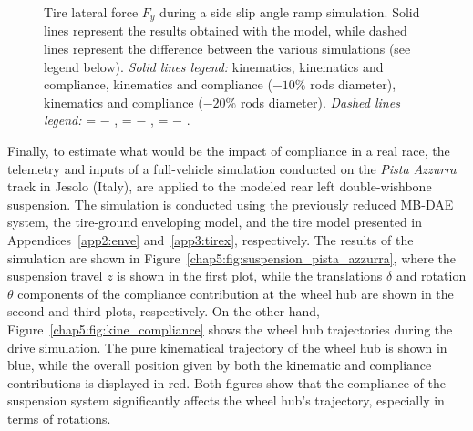 \begin{figure}[!htp]
  \centering
  \small{}
  \caption{Tire lateral force $F_y$ during a side slip angle ramp simulation. Solid lines represent the results obtained with the \Simulink{} model, while dashed lines represent the difference between the various simulations (see legend below). \emph{Solid lines legend:}
  {\color{mycolor1}\raisebox{-.15pt}{$\blacksquare$}} kinematics, {\color{mycolor2}\raisebox{-.15pt}{$\blacksquare$}} kinematics and compliance, {\color{mycolor3}\raisebox{-.15pt}{$\blacksquare$}} kinematics and compliance ($-10\%$ rods diameter), {\color{mycolor5}\raisebox{-.15pt}{$\blacksquare$}} kinematics and compliance ($-20\%$ rods diameter).   \emph{Dashed lines legend:} {\color{mycolor1}\raisebox{-.15pt}{\scalebox{0.5}[1.0]{$\blacksquare$}}}{\color{mycolor2}\raisebox{-.15pt}{\scalebox{0.5}[1.0]{$\blacksquare$}}} = {\color{mycolor1}\raisebox{-.15pt}{$\blacksquare$}} $-$ {\color{mycolor2}\raisebox{-.15pt}{$\blacksquare$}}, {\color{mycolor1}\raisebox{-.15pt}{\scalebox{0.5}[1.0]{$\blacksquare$}}}{\color{mycolor3}\raisebox{-.15pt}{\scalebox{0.5}[1.0]{$\blacksquare$}}} = {\color{mycolor1}\raisebox{-.15pt}{$\blacksquare$}} $-$ {\color{mycolor3}\raisebox{-.15pt}{$\blacksquare$}},  {\color{mycolor1}\raisebox{-.15pt}{\scalebox{0.5}[1.0]{$\blacksquare$}}}{\color{mycolor5}\raisebox{-.15pt}{\scalebox{0.5}[1.0]{$\blacksquare$}}} = {\color{mycolor1}\raisebox{-.15pt}{$\blacksquare$}} $-$ {\color{mycolor5}\raisebox{-.15pt}{$\blacksquare$}}.
  }
  \label{chap5:fig:test_bench}
\end{figure}

Finally, to estimate what would be the impact of compliance in a real race, the telemetry and inputs of a full-vehicle simulation conducted on the \textit{Pista Azzurra} track in Jesolo (Italy), are applied to the modeled rear left double-wishbone suspension. The simulation is conducted using the previously reduced \ac{MB}-\ac{DAE} system, the tire-ground enveloping model, and the tire model presented in Appendices~\ref{app2:enve} and~\ref{app3:tirex}, respectively. The results of the simulation are shown in Figure~\ref{chap5:fig:suspension_pista_azzurra}, where the suspension travel $z$ is shown in the first plot, while the translations $\delta$ and rotation $\theta$ components of the compliance contribution at the wheel hub are shown in the second and third plots, respectively. On the other hand, Figure~\ref{chap5:fig:kine_compliance} shows the wheel hub trajectories during the drive simulation. The pure kinematical trajectory of the wheel hub is shown in blue, while the overall position given by both the kinematic and compliance contributions is displayed in red. Both figures show that the compliance of the suspension system significantly affects the wheel hub's trajectory, especially in terms of rotations.


